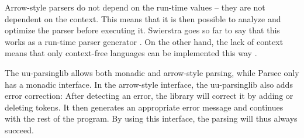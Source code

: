 Arrow-style parsers do not depend on the run-time values -- they are not dependent on the context.
This means that it is then possible to analyze and optimize the parser before executing it.
Swierstra goes so far to say that this works as a run-time parser generator \cite{error-correcting}.
On the other hand, the lack of context means that only context-free languages can be implemented this way \cite{parsec}.

The uu-parsinglib allows both monadic and arrow-style parsing, while Parsec only has a monadic interface.
In the arrow-style interface, the uu-parsinglib also adds error correction:
After detecting an error, the library will correct it by adding or deleting tokens.
It then generates an appropriate error message and continues with the rest of the program.
By using this interface, the parsing will thus always succeed.


